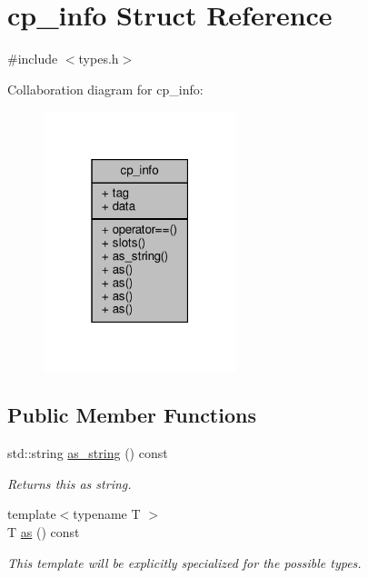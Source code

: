 \hypertarget{structcp__info}{}\section{cp\+\_\+info Struct Reference}
\label{structcp__info}


{\ttfamily \#include $<$types.\+h$>$}



Collaboration diagram for cp\+\_\+info\+:\nopagebreak
\begin{figure}[H]
\begin{center}
\leavevmode
\includegraphics[width=159pt]{structcp__info__coll__graph}
\end{center}
\end{figure}
\subsection*{Public Member Functions}
\begin{DoxyCompactItemize}
\item 
\mbox{\label{structcp__info_a8bdd7454a673dea621f24569c4c6aa01}} 
std\+::string \hyperlink{structcp__info_a8bdd7454a673dea621f24569c4c6aa01}{as\+\_\+string} () const
\begin{DoxyCompactList}\small\item\em Returns {\itshape this} as string. \end{DoxyCompactList}\item 
\mbox{\label{structcp__info_a73e88cec575d05a03d73cbfcc91cd71b}} 
{\footnotesize template$<$typename T $>$ }\\T \hyperlink{structcp__info_a73e88cec575d05a03d73cbfcc91cd71b}{as} () const
\begin{DoxyCompactList}\small\item\em This template will be explicitly specialized for the possible types. \end{DoxyCompactList}\end{DoxyCompactItemize}


